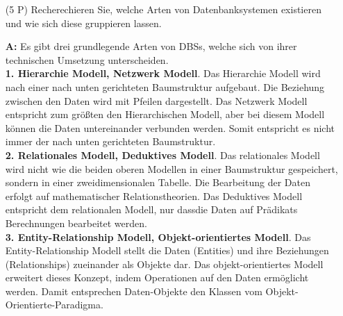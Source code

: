 \documentclass[12pt]{report}
\newcommand{\answer}{\textbf{A:}}
\begin{document}
\begin{enumerate}
\item[(5 P)] Recherechieren Sie, welche Arten von Datenbanksystemen existieren und wie sich diese gruppieren lassen.
\item[\answer]
  Es gibt drei grundlegende Arten von DBSs, welche sich von ihrer technischen Umsetzung unterscheiden.\\

  \textbf{1. Hierarchie Modell, Netzwerk Modell}. Das Hierarchie Modell wird nach einer nach unten gerichteten Baumstruktur aufgebaut. Die Beziehung zwischen den Daten wird mit Pfeilen dargestellt. Das Netzwerk Modell entspricht zum größten den Hierarchischen Modell, aber bei diesem Modell können die Daten untereinander verbunden werden. Somit entspricht es nicht immer der nach unten gerichteten Baumstruktur.\\

  \textbf{2. Relationales Modell, Deduktives Modell}. Das relationales Modell wird nicht wie die beiden oberen Modellen in einer Baumstruktur gespeichert, sondern in einer zweidimensionalen Tabelle. Die Bearbeitung der Daten erfolgt auf mathematischer Relationstheorien. Das Deduktives Modell entspricht dem relationalen Modell, nur dassdie Daten auf Prädikats Berechnungen bearbeitet werden.\\

  \textbf{3. Entity-Relationship Modell, Objekt-orientiertes Modell}. Das Entity-Relationship Modell stellt die Daten (Entities) und ihre Beziehungen (Relationships) zueinander als Objekte dar. Das objekt-orientiertes Modell erweitert dieses Konzept, indem Operationen auf den Daten ermöglicht werden. Damit entsprechen Daten-Objekte den Klassen vom Objekt-Orientierte-Paradigma.


\end{enumerate}
\end{document}
